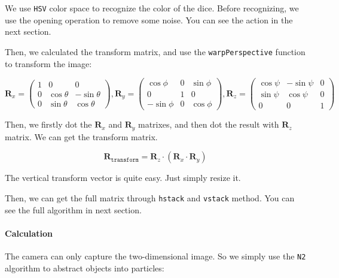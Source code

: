 \documentclass{article}
\begin{document}
We use \texttt{HSV} color space to recognize the color of the dice. Before recognizing, we use the opening operation to remove some noise. You can see the action in the next section.

Then, we calculated the transform matrix, and use the \texttt{warpPerspective} function to transform the image:

\begin{equation}
  \boldsymbol{R}_x=
  \left(
  \begin{matrix}
    1 & 0 & 0 \\
    0 & \cos\theta & -\sin\theta \\
    0 & \sin\theta & \cos\theta
  \end{matrix}
  \right),
  \boldsymbol{R}_y=
  \left(
  \begin{matrix}
    \cos\phi & 0 & \sin\phi \\
    0 & 1 & 0 \\
    -\sin\phi & 0 & \cos\phi
  \end{matrix}
  \right),
  \boldsymbol{R}_z=
  \left(
  \begin{matrix}
    \cos\psi & -\sin\psi & 0 \\
    \sin\psi & \cos\psi & 0 \\
    0 & 0 & 1
  \end{matrix}
  \right)
\end{equation}

Then, we firstly dot the $\boldsymbol{R}_x$ and $\boldsymbol{R}_y$ matrixes, and then dot the result with $\boldsymbol{R}_z$ matrix. We can get the transform matrix.

\begin{equation}
  \boldsymbol{R}_{\texttt{transform}}=\boldsymbol{R}_z\cdot\left(\boldsymbol{R}_x\cdot\boldsymbol{R}_y\right)
\end{equation}

The vertical transform vector is quite easy. Just simply resize it.

Then, we can get the full matrix through \texttt{hstack} and \texttt{vstack} method. You can see the full algorithm in next section.

\paragraph{Calculation}

The camera can only capture the two-dimensional image. So we simply use the \texttt{N2} algorithm to abstract objects into particles:
\end{document}
